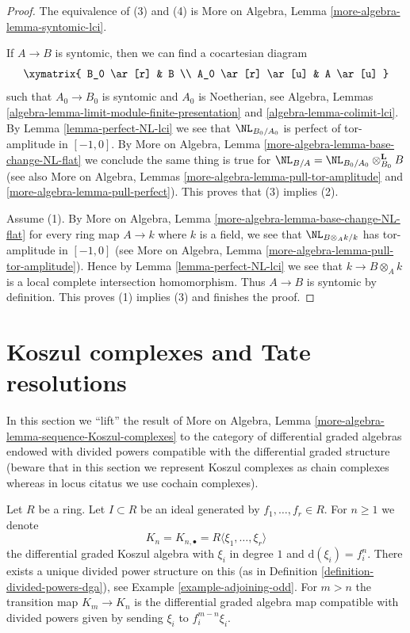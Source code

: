 \begin{proof}
The equivalence of (3) and (4) is More on Algebra, Lemma
\ref{more-algebra-lemma-syntomic-lci}.

\medskip\noindent
If $A \to B$ is syntomic, then we can find a cocartesian diagram
$$
\xymatrix{
B_0 \ar[r] & B \\
A_0 \ar[r] \ar[u] & A \ar[u]
}
$$
such that $A_0 \to B_0$ is syntomic and $A_0$ is Noetherian, see
Algebra, Lemmas \ref{algebra-lemma-limit-module-finite-presentation} and
\ref{algebra-lemma-colimit-lci}. By Lemma \ref{lemma-perfect-NL-lci}
we see that $\NL_{B_0/A_0}$ is perfect of tor-amplitude in $[-1, 0]$.
By More on Algebra, Lemma \ref{more-algebra-lemma-base-change-NL-flat}
we conclude the same thing is true for
$\NL_{B/A} = \NL_{B_0/A_0} \otimes_{B_0}^\mathbf{L} B$ (see
also More on Algebra, Lemmas \ref{more-algebra-lemma-pull-tor-amplitude} and
\ref{more-algebra-lemma-pull-perfect}).
This proves that (3) implies (2).

\medskip\noindent
Assume (1). By More on Algebra, Lemma
\ref{more-algebra-lemma-base-change-NL-flat}
for every ring map $A \to k$ where
$k$ is a field, we see that $\NL_{B \otimes_A k/k}$ has
tor-amplitude in $[-1, 0]$ (see
More on Algebra, Lemma \ref{more-algebra-lemma-pull-tor-amplitude}).
Hence by Lemma \ref{lemma-perfect-NL-lci} we see that $k \to B \otimes_A k$ is
a local complete intersection homomorphism. Thus $A \to B$
is syntomic by definition. This proves (1) implies (3)
and finishes the proof.
\end{proof}





\section{Koszul complexes and Tate resolutions}
\label{section-koszul-vs-tate}

\noindent
In this section we ``lift'' the result of
More on Algebra, Lemma \ref{more-algebra-lemma-sequence-Koszul-complexes}
to the category of differential graded algebras endowed with divided
powers compatible with the differential graded structure (beware
that in this section we represent Koszul complexes as chain complexes
whereas in locus citatus we use cochain complexes).

\medskip\noindent
Let $R$ be a ring. Let $I \subset R$ be an ideal generated
by $f_1, \ldots, f_r \in R$. For $n \geq 1$ we denote
$$
K_n = K_{n, \bullet} = R\langle \xi_1, \ldots, \xi_r\rangle
$$
the differential graded Koszul algebra with $\xi_i$ in degree $1$ and
$\text{d}(\xi_i) = f_i^n$. There exists a unique divided power structure on this
(as in Definition \ref{definition-divided-powers-dga}), see
Example \ref{example-adjoining-odd}. For $m > n$ the transition map
$K_m \to K_n$ is the differential graded algebra map compatible with
divided powers given by sending $\xi_i$ to $f_i^{m - n}\xi_i$.

